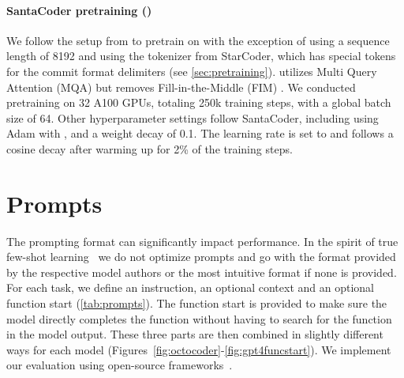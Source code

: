 \paragraph{SantaCoder pretraining (\modelsc{})} We follow the setup from \citet{allal2023santacoder} to pretrain on \data{} with the exception of using a sequence length of 8192 and using the tokenizer from StarCoder, which has special tokens for the commit format delimiters (see \autoref{sec:pretraining}). \modelsc{} utilizes Multi Query Attention (MQA) \citep{shazeer2019mqa} but removes Fill-in-the-Middle (FIM) \citep{bavarian2022fim}. We conducted pretraining on 32 A100 GPUs, totaling 250k training steps, with a global batch size of 64. Other hyperparameter settings follow SantaCoder, including using Adam with , and a weight decay of 0.1. The learning rate is set to  and follows a cosine decay after warming up for 2\% of the training steps. 



\section{Prompts}
\label{sec:prompts}


The prompting format can significantly impact performance. In the spirit of true few-shot learning~\citep{perez2021true} we do not optimize prompts and go with the format provided by the respective model authors or the most intuitive format if none is provided. For each task, we define an instruction, an optional context and an optional function start (\autoref{tab:prompts}). The function start is provided to make sure the model directly completes the function without having to search for the function in the model output. These three parts are then combined in slightly different ways for each model (Figures~\ref{fig:octocoder}-\ref{fig:gpt4funcstart}). We implement our evaluation using open-source frameworks~\citep{bigcode-evaluation-harness,eval-harness}.


